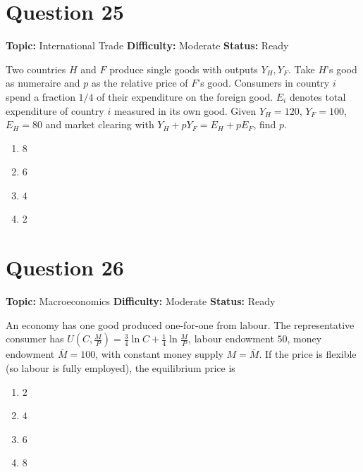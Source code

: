 \documentclass[11pt]{article}
\begin{document}
\newpage

\section*{Question 25}


\noindent\textbf{Topic:} International Trade \quad \textbf{Difficulty:} Moderate \quad \textbf{Status:} Ready



Two countries $H$ and $F$ produce single goods with outputs $Y_H, Y_F$. Take
$H$'s good as numeraire and $p$ as the relative price of $F$'s good. Consumers
in country $i$ spend a fraction $1/4$ of their expenditure on the foreign good.
$E_i$ denotes total expenditure of country $i$ measured in its own good.
Given $Y_H = 120$, $Y_F = 100$, $E_H = 80$ and market clearing with
$Y_H + p Y_F = E_H + p E_F$, find $p$.
\begin{enumerate}[label=(\Alph*)]
\item $8$ \item $6$ \item $4$ \item $2$
\end{enumerate}

\newpage

\section*{Question 26}


\noindent\textbf{Topic:} Macroeconomics \quad \textbf{Difficulty:} Moderate \quad \textbf{Status:} Ready



An economy has one good produced one-for-one from labour. The representative
consumer has $U\!\left(C, \tfrac{M}{P}\right) = \tfrac{3}{4}\ln C + \tfrac{1}{4}\ln\!\tfrac{M}{P}$,
labour endowment $50$, money endowment $\bar M = 100$, with constant money
supply $M = \bar M$. If the price is flexible (so labour is fully employed), the
equilibrium price is
\begin{enumerate}[label=(\Alph*)]
\item $2$ \item $4$ \item $6$ \item $8$
\end{enumerate}
\end{document}
